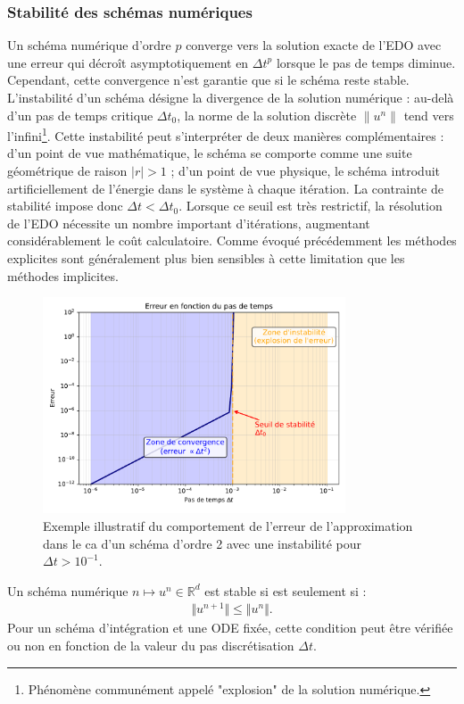 \subsubsection{Stabilité des schémas numériques}\label{par:stabilite_edo}
Un schéma numérique d'ordre $p$ converge vers la solution exacte de l'EDO avec une erreur qui décroît asymptotiquement en $\Delta t^p$ lorsque le pas de temps diminue.
Cependant, cette convergence n'est garantie que si le schéma reste stable.
L'instabilité d'un schéma désigne la divergence de la solution numérique : au-delà d'un pas de temps critique $\Delta t_0$, la norme de la solution discrète $\|u^n\|$ tend vers l'infini\footnote{Phénomène communément appelé "explosion" de la solution numérique.}.
Cette instabilité peut s'interpréter de deux manières complémentaires : d'un point de vue mathématique, le schéma se comporte comme une suite géométrique de raison $|r| > 1$ ; d'un point de vue physique, le schéma introduit artificiellement de l'énergie dans le système à chaque itération.
La contrainte de stabilité impose donc $\Delta t < \Delta t_0$. Lorsque ce seuil est très restrictif, la résolution de l'EDO nécessite un nombre important d'itérations, augmentant considérablement le coût calculatoire. 
Comme évoqué précédemment les méthodes explicites sont généralement plus bien sensibles à cette limitation que les méthodes implicites.
\begin{figure}[htbp]
    \centering
    \includegraphics[width=0.8\textwidth]{media/3_/2_/exemple_satabilite.pdf}
    \caption{Exemple illustratif du comportement de l'erreur de l'approximation dans le ca d'un schéma d'ordre 2 avec une instabilité pour $\Delta t > 10^{-1}$.}
    \label{fig:stabilite_schema}
\end{figure}
\begin{definition}
    Un schéma numérique $n \mapsto u^n \in \mathbb{R}^d$ est stable si est seulement si :
    \begin{align}
        \Vert u^{n+1} \Vert \leq \Vert u^n \Vert.
    \end{align}
    Pour un schéma d'intégration et une ODE fixée, cette condition peut être vérifiée ou non en fonction de la valeur 
    du pas discrétisation $\Delta t$.
\end{definition}
